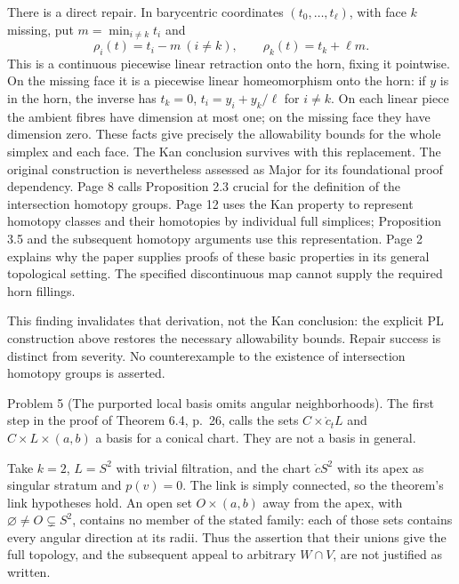 \documentclass[10pt]{article}
\begin{document}
There is a direct repair. In barycentric coordinates \((t_0,\ldots,t_\ell)\), with face \(k\) missing, put \(m=\min_{i\ne k}t_i\) and \[\rho_i(t)=t_i-m\ (i\ne k),\qquad
 \rho_k(t)=t_k+\ell m .\] This is a continuous piecewise linear retraction onto the horn, fixing it pointwise. On the missing face it is a piecewise linear homeomorphism onto the horn: if \(y\) is in the horn, the inverse has \(t_k=0\), \(t_i=y_i+y_k/\ell\) for \(i\ne k\). On each linear piece the ambient fibres have dimension at most one; on the missing face they have dimension zero. These facts give precisely the allowability bounds for the whole simplex and each face. The Kan conclusion survives with this replacement. The original construction is nevertheless assessed as Major for its foundational proof dependency. Page 8 calls Proposition 2.3 crucial for the definition of the intersection homotopy groups. Page 12 uses the Kan property to represent homotopy classes and their homotopies by individual full simplices; Proposition 3.5 and the subsequent homotopy arguments use this representation. Page 2 explains why the paper supplies proofs of these basic properties in its general topological setting. The specified discontinuous map cannot supply the required horn fillings.\par
This finding invalidates that derivation, not the Kan conclusion: the explicit PL construction above restores the necessary allowability bounds. Repair success is distinct from severity. No counterexample to the existence of intersection homotopy groups is asserted.\par
Problem 5 (The purported local basis omits angular neighborhoods).  The first step in the proof of Theorem 6.4, p. 26, calls the sets \(C\times\mathring c_tL\) and \(C\times L\times(a,b)\) a basis for a conical chart. They are not a basis in general.\par
Take \(k=2\), \(L=S^2\) with trivial filtration, and the chart \(\mathring cS^2\) with its apex as singular stratum and \(p(v)=0\). The link is simply connected, so the theorem’s link hypotheses hold. An open set \(O\times(a,b)\) away from the apex, with \(\varnothing\ne O\subsetneq S^2\), contains no member of the stated family: each of those sets contains every angular direction at its radii. Thus the assertion that their unions give the full topology, and the subsequent appeal to arbitrary \(W\cap V\), are not justified as written.\par
\end{document}
